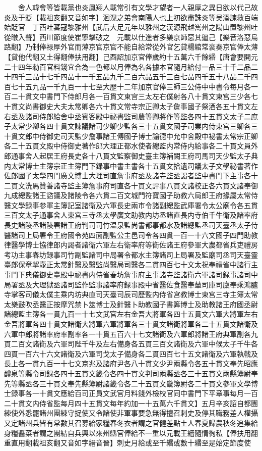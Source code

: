 　　舍人韓會等皆載黨也炎鳳翔人載常引有文學才望者一人親厚之異日欲以代己故炎及于貶【載祖亥翻又音如字】洄滉之弟會南陽人也上初欲盡誅炎等吴湊諫救百端始貶官　丁酉吐蕃寇黎雅州【武后大足元年以雅州之漢源飛越嶲州之陽山置黎州吐從暾入聲】西川節度使崔寧擊破之　元載以仕進者多樂京師惡其逼己【樂音洛惡烏路翻】乃制俸禄厚外官而薄京官京官不能自給常從外官乞貸楊綰常衮奏京官俸太薄【貸他代翻又土得翻俸扶用翻】己酉詔加京官俸歲約十五萬六千餘緡【唐會要開元二十四年勑百官料錢宜合為一色都以月俸為名各據本官隨月給付一品三十千二品二十四千三品十七千四品十一千五品九千二百六品五千三百七品四千五十八品二千四百七十五九品一千九百一十七至大歷十二年加京官俸三師三公侍中中書令每月各一百二十貫文中書門下侍郎月各一百貫文東宫三太左右僕射各八十貫文東宫三少各七十貫文尚書御史大夫太常卿各六十貫文常寺宗正卿太子詹事國子祭酒各五十貫文左右丞及諸司侍郎給舍中丞賓客殿中祕書監司農等卿將作等監各四十五貫文太子二庶子太常少卿各四十貫文諫議諸司少卿少監各三十五貫文國子司業内侍東宫三卿各三十貫文郎中侍御史司天監少詹事諸王傅國子博士諭德中允中舍殿中袐書太常宗正卿各二十五貫文殿中侍御史著作郎大理正都水使者總監内常侍内給事各二十貫文員外郎通事舍人起居王府長史各十八貫文監察御史臺主簿補闕王府司馬司天少監太子典内太常博士主簿宗正主簿門下録事中書主書各十五貫文拾遺司議太子文學祕書著作佐郎國子太學四門廣文博士大理司直詹事府丞及諸寺監丞謁者監中書門下主事各十二貫文洗馬贊善諸寺監主簿詹事府司直各十貫文評事八貫文諸校正各六貫文諸奉御九成總監諸王諮議及諸陵令各六貫二百文城門符寶國子助教六局郎王府掾屬太常侍醫文學録事参軍主簿記室諸衛及六軍長史兩市令諸副總監武庫署令太公廟令各五貫三百文太子通事舍人東宫三寺丞太學廣文助教内坊丞諸直長内寺伯千牛衛及諸率府長史諸陵丞諸陵署諸王府判司司竹温泉監尚書都事都水及諸總監丞司天臺丞太子侍醫諸司上局署令王府國令苑四面副監公主邑司令各四貫一百一十六文國子四門助教律醫學博士協律郎内謁者諸衛六軍左右衛率府等衛佐諸王府參軍大農都省兵吏禮房考功主事春坊録事司竹副監諸司中局署令都水主簿諸司上局署及監廟司丞司天臺靈臺郎保章挈壺正太常針醫及醫監尚醫局司醫各二貫四百七十文太祝奉禮省中諸行主事門下典儀御史臺殿中祕書内侍省春坊詹事府主事諸寺監諸衛六軍諸司録事諸司中局署丞及大理獄丞諸司監作監事諸率府録事殿中省醫佐食醫奉輦司庫司廩奉乘鴻臚寺掌客司儀太僕主乘内坊典直司天臺司辰司歷監内侍省宫教博士東宫三寺主簿太常太樂鼓吹丞醫正按摩咒禁卜筮博士及針醫卜助教國子書筭博士及助教諸王府國丞尉諸總監主簿各一貫九百一十七文武官左右金吾大將軍各四十五貫文六軍大將軍左右金吾將軍各四十貫文諸衛大將軍六軍將軍各三十貫文諸衛將軍各二十五貫文諸衛及六軍中郎將諸率府率副率各一十貫五百六十七文諸衛及六軍郎將諸王府典軍副各九貫二百文諸衛及六軍司陛千牛及左右備身各五貫三百文諸衛及六軍中候太子千牛各四貫一百六十六文諸衛及六軍司戈太子備身各二貫四百七十五文諸衛及六軍執戟及長上各一貫九百一十七文京兆及諸府尹各八十貫文少尹兩縣令各五十貫文奉先昭應醴泉等縣令司録各四十五貫文畿令各四十貫文判司兩縣丞各三十五貫文兩縣簿尉奉先等縣丞各三十貫文奉先縣簿尉諸畿令各二十五貫文畿簿尉各二十貫文參軍文學博士録事各一十貫文應給百司正員文武官月料錢外檢校官同中書門下平章事每月一百二十貫文内侍省監每月四十五貫文每年約加一十五萬六千貫文】五月辛亥詔自都團練使外悉罷諸州團練守捉使又令諸使非軍事要急無得擅召刺史及停其職務差人權攝又定諸州兵皆有常數其召募給家糧春冬衣者謂之官健差點土人春夏歸農秋冬追集給身糧醬菜者謂之團結自兵興以來州縣官俸給不一重以元載王縉隨情徇私【俸扶用翻重直用翻載祖亥翻又音如字縉音晉】刺史月給或至千緡或數十緡至是始定節度使